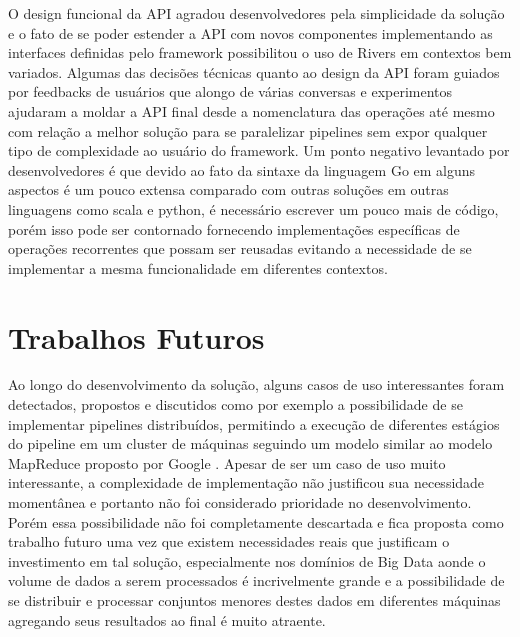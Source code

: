 O design funcional da API agradou desenvolvedores pela simplicidade da solução e o fato de se poder estender a API com novos componentes implementando as interfaces definidas pelo framework possibilitou o uso de Rivers em contextos bem variados. Algumas das decisões técnicas quanto ao design da API foram guiados por feedbacks de usuários que alongo de várias conversas e experimentos ajudaram a moldar a API final desde a nomenclatura das operações até mesmo com relação a melhor solução para se paralelizar pipelines sem expor qualquer tipo de complexidade ao usuário do framework. Um ponto negativo levantado por desenvolvedores é que devido ao fato da sintaxe da linguagem Go em alguns aspectos é um pouco extensa comparado com outras soluções em outras linguagens como scala e python, é necessário escrever um pouco mais de código, porém isso pode ser contornado fornecendo implementações específicas de operações recorrentes que possam ser reusadas evitando a necessidade de se implementar a mesma funcionalidade em diferentes contextos.

\section{Trabalhos Futuros}
\label{sec:future_work}

Ao longo do desenvolvimento da solução, alguns casos de uso interessantes foram detectados, propostos e discutidos como por exemplo a possibilidade de se implementar pipelines distribuídos, permitindo a execução de diferentes estágios do pipeline em um cluster de máquinas seguindo um modelo similar ao modelo MapReduce proposto por Google \cite{paper:google:map_reduce}. Apesar de ser um caso de uso muito interessante, a complexidade de implementação não justificou sua necessidade momentânea e portanto não foi considerado prioridade no desenvolvimento. Porém essa possibilidade não foi completamente descartada e fica proposta como trabalho futuro uma vez que existem necessidades reais que justificam o investimento em tal solução, especialmente nos domínios de Big Data aonde o volume de dados a serem processados é incrivelmente grande e a possibilidade de se distribuir e processar conjuntos menores destes dados em diferentes máquinas agregando seus resultados ao final é muito atraente.